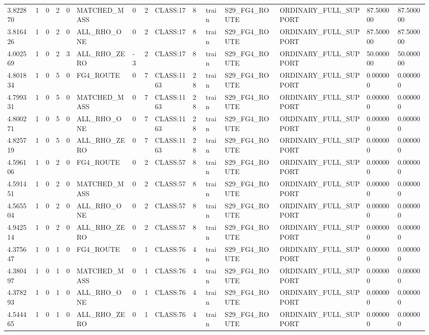 \begin{tabular}{lllllllllllllll}
3.822870 & 1 & 0 & 2 & 0 & MATCHED\_MASS & 0 & 2 & CLASS:17 & 8 & train & S29\_FG4\_ROUTE & ORDINARY\_FULL\_SUPPORT & 87.500000 & 87.500000 \\
3.816426 & 1 & 0 & 2 & 0 & ALL\_RHO\_ONE & 0 & 2 & CLASS:17 & 8 & train & S29\_FG4\_ROUTE & ORDINARY\_FULL\_SUPPORT & 87.500000 & 87.500000 \\
4.002569 & 1 & 0 & 2 & 3 & ALL\_RHO\_ZERO & -3 & 2 & CLASS:17 & 8 & train & S29\_FG4\_ROUTE & ORDINARY\_FULL\_SUPPORT & 50.000000 & 50.000000 \\
4.801834 & 1 & 0 & 5 & 0 & FG4\_ROUTE & 0 & 7 & CLASS:1163 & 28 & train & S29\_FG4\_ROUTE & ORDINARY\_FULL\_SUPPORT & 0.000000 & 0.000000 \\
4.799331 & 1 & 0 & 5 & 0 & MATCHED\_MASS & 0 & 7 & CLASS:1163 & 28 & train & S29\_FG4\_ROUTE & ORDINARY\_FULL\_SUPPORT & 0.000000 & 0.000000 \\
4.800271 & 1 & 0 & 5 & 0 & ALL\_RHO\_ONE & 0 & 7 & CLASS:1163 & 28 & train & S29\_FG4\_ROUTE & ORDINARY\_FULL\_SUPPORT & 0.000000 & 0.000000 \\
4.825719 & 1 & 0 & 5 & 0 & ALL\_RHO\_ZERO & 0 & 7 & CLASS:1163 & 28 & train & S29\_FG4\_ROUTE & ORDINARY\_FULL\_SUPPORT & 0.000000 & 0.000000 \\
4.596106 & 1 & 0 & 2 & 0 & FG4\_ROUTE & 0 & 2 & CLASS:57 & 8 & train & S29\_FG4\_ROUTE & ORDINARY\_FULL\_SUPPORT & 0.000000 & 0.000000 \\
4.591451 & 1 & 0 & 2 & 0 & MATCHED\_MASS & 0 & 2 & CLASS:57 & 8 & train & S29\_FG4\_ROUTE & ORDINARY\_FULL\_SUPPORT & 0.000000 & 0.000000 \\
4.565504 & 1 & 0 & 2 & 0 & ALL\_RHO\_ONE & 0 & 2 & CLASS:57 & 8 & train & S29\_FG4\_ROUTE & ORDINARY\_FULL\_SUPPORT & 0.000000 & 0.000000 \\
4.942514 & 1 & 0 & 2 & 0 & ALL\_RHO\_ZERO & 0 & 2 & CLASS:57 & 8 & train & S29\_FG4\_ROUTE & ORDINARY\_FULL\_SUPPORT & 0.000000 & 0.000000 \\
4.375647 & 1 & 0 & 1 & 0 & FG4\_ROUTE & 0 & 1 & CLASS:76 & 4 & train & S29\_FG4\_ROUTE & ORDINARY\_FULL\_SUPPORT & 0.000000 & 0.000000 \\
4.380497 & 1 & 0 & 1 & 0 & MATCHED\_MASS & 0 & 1 & CLASS:76 & 4 & train & S29\_FG4\_ROUTE & ORDINARY\_FULL\_SUPPORT & 0.000000 & 0.000000 \\
4.378293 & 1 & 0 & 1 & 0 & ALL\_RHO\_ONE & 0 & 1 & CLASS:76 & 4 & train & S29\_FG4\_ROUTE & ORDINARY\_FULL\_SUPPORT & 0.000000 & 0.000000 \\
4.544465 & 1 & 0 & 1 & 0 & ALL\_RHO\_ZERO & 0 & 1 & CLASS:76 & 4 & train & S29\_FG4\_ROUTE & ORDINARY\_FULL\_SUPPORT & 0.000000 & 0.000000 \\

\end{tabular}
